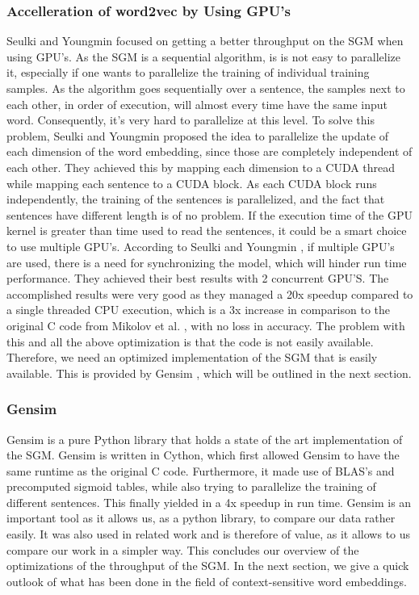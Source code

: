 \subsubsection{Accelleration of word2vec by Using GPU's}
Seulki and Youngmin \cite{gpu} focused on getting a better throughput on the SGM when using GPU's. As the SGM is a sequential algorithm, is is not easy to parallelize it, especially if one wants to parallelize the training of individual training samples. As the algorithm goes sequentially over a sentence, the samples next to each other, in order of execution, will almost every time have the same input word. Consequently, it's very hard to parallelize at this level. To solve this problem, Seulki and Youngmin \cite{gpu} proposed the idea to parallelize the update of each dimension of the word embedding, since those are completely independent of each other. They achieved this by mapping each dimension to a CUDA thread while mapping each sentence to a CUDA block. As each CUDA block runs independently, the training of the sentences is parallelized, and the fact that sentences have different length is of no problem. If the execution time of the GPU kernel is greater than time used to read the sentences, it could be a smart choice to use multiple GPU's. According to Seulki and Youngmin \cite{gpu}, if multiple GPU's are used, there is a need for synchronizing the model, which will hinder run time performance. They achieved their best results with 2 concurrent GPU'S. The accomplished results were very good as they managed a 20x speedup compared to a single threaded CPU execution, which is a 3x increase in comparison to the original C code from Mikolov et al. \cite{mikolov2}, with no loss in accuracy. The problem with this and all the above optimization is that the code is not easily available. Therefore, we need an optimized implementation of the SGM that is easily available. This is provided by Gensim \cite{gensim}, which will be outlined in the next section.
\subsubsection{Gensim}\label{ssec:gensim}
Gensim \cite{gensim} is a pure Python library that holds a state of the art implementation of the SGM. Gensim is written in Cython, which first allowed Gensim to have the same runtime as the original C code. Furthermore, it made use of BLAS's and precomputed sigmoid tables, while also trying to parallelize the training of different sentences. This finally yielded in a 4x speedup in run time. Gensim is an important tool as it allows us, as a python library, to compare our data rather easily. It was also used in related work \cite{intel} and is therefore of value, as it allows to us compare our work in a simpler way. This concludes our overview of the optimizations of the throughput of the SGM. In the next section, we give a quick outlook of what has been done in the field of context-sensitive word embeddings.

